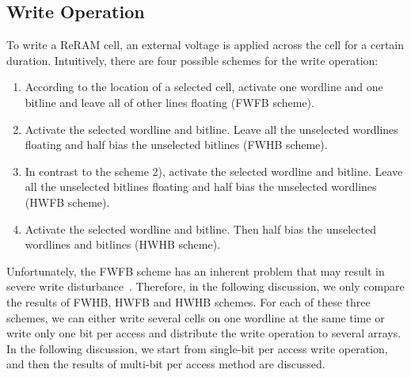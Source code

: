\subsection{Write Operation}
To write a ReRAM cell, an external voltage is applied across the cell for
a certain duration. Intuitively, there are four possible schemes for the
write operation:
\begin{enumerate}
  \item According to the location of a selected cell, activate one
      wordline and one bitline and leave all of other lines floating
      (FWFB scheme).
  \item Activate the selected wordline and bitline. Leave all the
      unselected wordlines floating and half bias the unselected
      bitlines (FWHB scheme).
  \item In contrast to the scheme 2), activate the selected wordline
      and bitline. Leave all the unselected bitlines floating and half       bias the unselected wordlines (HWFB scheme).
  \item Activate the selected wordline and bitline. Then half bias the       unselected wordlines and bitlines (HWHB scheme).
\end{enumerate}
Unfortunately, the FWFB scheme has an inherent problem that may result in severe write disturbance~\cite{crossbar_NANO2003_Ziegler}. Therefore, in the following discussion, we only compare the results of FWHB, HWFB and
HWHB schemes. For each of these three schemes, we can either write several cells on one wordline at the same time or write only one bit per access
and distribute the write operation to several arrays. In the following
discussion, we start from single-bit per access write operation, and then
the results of multi-bit per access method are discussed.

